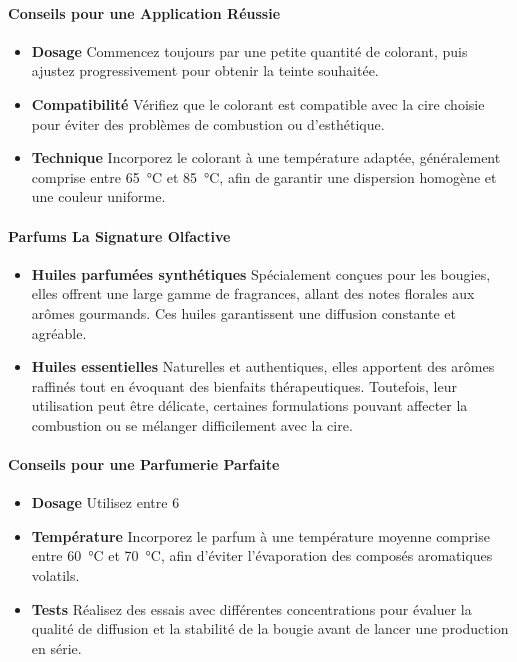 \documentclass[11pt,fleqn,onecolumn,oneside]{book}
\begin{document}
\paragraph{Conseils pour une Application Réussie}
\begin{itemize}
    \item \textbf{Dosage} Commencez toujours par une petite quantité de colorant, puis ajustez progressivement pour obtenir la teinte souhaitée.
    \item \textbf{Compatibilité} Vérifiez que le colorant est compatible avec la cire choisie pour éviter des problèmes de combustion ou d’esthétique.
    \item \textbf{Technique} Incorporez le colorant à une température adaptée, généralement comprise entre \SI{65}{\degreeCelsius} et \SI{85}{\degreeCelsius}, afin de garantir une dispersion homogène et une couleur uniforme.
\end{itemize}

\paragraph{Parfums La Signature Olfactive}

\begin{itemize}
    \item \textbf{Huiles parfumées synthétiques} Spécialement conçues pour les bougies, elles offrent une large gamme de fragrances, allant des notes florales aux arômes gourmands. Ces huiles garantissent une diffusion constante et agréable.
    \item \textbf{Huiles essentielles} Naturelles et authentiques, elles apportent des arômes raffinés tout en évoquant des bienfaits thérapeutiques. Toutefois, leur utilisation peut être délicate, certaines formulations pouvant affecter la combustion ou se mélanger difficilement avec la cire.
\end{itemize}

\paragraph{Conseils pour une Parfumerie Parfaite}
\begin{itemize}
    \item \textbf{Dosage} Utilisez entre 6 %
    \item \textbf{Température} Incorporez le parfum à une température moyenne comprise entre \SI{60}{\degreeCelsius} et \SI{70}{\degreeCelsius}, afin d’éviter l’évaporation des composés aromatiques volatils.
    \item \textbf{Tests} Réalisez des essais avec différentes concentrations pour évaluer la qualité de diffusion et la stabilité de la bougie avant de lancer une production en série.
\end{itemize}
\end{document}
